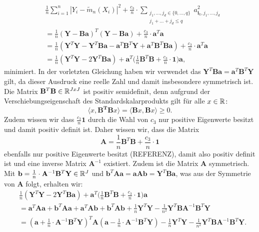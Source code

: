 \begin{equation}
\begin{split}
& \frac{1}{n} \sum_{i = 1}^n|Y_i - \tilde{m}_n(X_i)|^2 + \frac{c_3}{n} \cdot \sum_{\substack{ j_1,\dots,j_d \in \{0,\dots,q\} \\j_1+\dots +j_d \leq q}} a_{\mathbf{i}_k,j_1,\dots,j_d}^2 \\
& = \frac{1}{n}(\mathbf{Y} - \mathbf{B}\mathbf{a})^T(\mathbf{Y} - \mathbf{B}\mathbf{a}) + \frac{c_3}{n} \cdot \mathbf{a}^T\mathbf{a} \\
& = \frac{1}{n}(\mathbf{Y}^T\mathbf{Y} - \mathbf{Y}^T\mathbf{B}\mathbf{a} - \mathbf{a}^T\mathbf{B}^T\mathbf{Y} + \mathbf{a}^T\mathbf{B}^T\mathbf{B}\mathbf{a}) + \frac{c_3}{n} \cdot \mathbf{a}^T\mathbf{a} \\
& = \frac{1}{n}(\mathbf{Y}^T\mathbf{Y} - 2\mathbf{Y}^T\mathbf{B}\mathbf{a}) + \mathbf{a}^T\bigg(\frac{1}{n} \mathbf{B}^T\mathbf{B} + \frac{c_3}{n} \cdot \mathbf{1}\bigg) \mathbf{a}, 
\end{split}
\end{equation} 
minimiert. In der vorletzten Gleichung haben wir verwendet das $\mathbf{Y}^T\mathbf{B}\mathbf{a} = \mathbf{a}^T\mathbf{B}^T\mathbf{Y}$ gilt, da dieser Ausdruck eine reelle Zahl und damit insbesondere symmetrisch ist. 
Die Matrix $\mathbf{B}^T\mathbf{B} \in \mathbb{R}^{JxJ}$ ist positiv semidefinit, denn aufgrund der Verschiebungseigenschaft des Standardskalarprodukts gilt für alle $x \in \mathbb{R}\colon$
$$\langle x, \mathbf{B^T}\mathbf{B} x\rangle = \langle \mathbf{B} x, \mathbf{B} x\rangle \geq 0.$$
Zudem wissen wir dass $\frac{c_3}{n}\mathbf{1}$ durch die Wahl von $c_3$ nur positive Eigenwerte besitzt und damit positiv definit ist.  
Daher wissen wir, dass die Matrix
$$\mathbf{A} = \frac{1}{n}\mathbf{B}^T\mathbf{B} + \frac{c_3}{n} \cdot \mathbf{1}$$ ebenfalls nur positive Eigenwerte besitzt (REFERENZ), damit also positiv definit ist und eine inverse Matrix $\mathbf{A}^{-1}$ existiert. Zudem ist die Matrix $\mathbf{A}$ symmetrisch. 
Mit $\mathbf{b} = \frac{1}{n} \cdot \mathbf{A}^{-1}\mathbf{B}^T\mathbf{Y} \in \mathbb{R}^J$ und $\mathbf{b}^T\mathbf{A}\mathbf{a} = \mathbf{a}\mathbf{A}\mathbf{b} = \mathbf{Y}^T\mathbf{B}\mathbf{a}$, was aus der Symmetrie von $\mathbf{A}$ folgt, erhalten wir$\colon$
\begin{equation*}
\begin{split}
& \frac{1}{n}(\mathbf{Y}^T\mathbf{Y} - 2\mathbf{Y}^T\mathbf{B}\mathbf{a}) + \mathbf{a}^T\bigg(\frac{1}{n} \mathbf{B}^T\mathbf{B} + \frac{c_3}{n} \cdot \mathbf{1}\bigg) \mathbf{a} \\
& = \mathbf{a}^T\mathbf{A}\mathbf{a} + \mathbf{b}^T\mathbf{A}\mathbf{a} + \mathbf{a}^T\mathbf{A}\mathbf{b} + \mathbf{b}^T\mathbf{A}\mathbf{b} + \frac{1}{n}\mathbf{Y}^T\mathbf{Y} - \frac{1}{n^2}\mathbf{Y}^T\mathbf{B}\mathbf{A}^{-1}\mathbf{B}^T\mathbf{Y} \\
& = (\mathbf{a} + \frac{1}{n} \cdot \mathbf{A}^{-1}\mathbf{B}^T\mathbf{Y})^T \mathbf{A} (\mathbf{a} - \frac{1}{n} \cdot \mathbf{A}^{-1} \mathbf{B}^T\mathbf{Y}) - \frac{1}{n}\mathbf{Y}^T\mathbf{Y} - \frac{1}{n^2}\mathbf{Y}^T\mathbf{B}\mathbf{A}^{-1}\mathbf{B}^T\mathbf{Y}.
\end{split} 
\end{equation*} 
